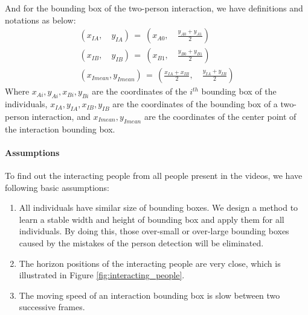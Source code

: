 And for the bounding box of the two-person interaction, we have definitions and notations as below:
\begin{eqnarray}
	(x_{IA}, \quad y_{IA})\,  = \ ({x_{A0}, \quad \frac{y_{A0} + y_{A1}}{2}}) \\
	({x_{IB}, \quad y_{IB}})\,  = \  ({x_{B1}, \quad \frac{y_{B0} + y_{B1}}{2}}) \\
	(x_{Imean}, y_{Imean}) \, = \, (\frac{x_{IA} + x_{IB}}{2}, \quad \frac{y_{IA} + y_{IB}}{2})
\end{eqnarray}
Where \(x_{Ai},y_{Ai},x_{Bi},y_{Bi}\) are the coordinates of the \(i^{th}\) bounding box of the individuals, \(x_{IA},y_{IA},x_{IB},y_{IB}\) are the coordinates of the bounding box of a two-person interaction, and \(x_{Imean},y_{Imean}\) are the coordinates of the center point of the interaction bounding box.

\paragraph*{Assumptions}
To find out the interacting people from all people present in the videos, we have following basic assumptions: 
\begin{enumerate}
	\item All individuals have similar size of bounding boxes. We design a method to learn a stable width and height of bounding box and apply them for all individuals. By doing this, those over-small or over-large bounding boxes caused by the mistakes of the person detection will be eliminated.
	\item The horizon positions of the interacting people are very close, which is illustrated in Figure \ref{fig:interacting_people}.
	\item The moving speed of an interaction bounding box is slow between two successive frames.
\end{enumerate}

